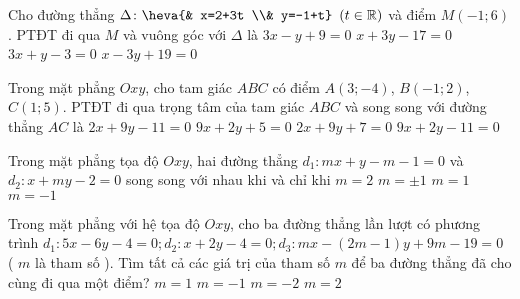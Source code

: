 	\begin{ex}%
		Cho đường thẳng $\Delta \colon \heva{& x=2+3t \\& y=-1+t}~\left(t \in \mathbb{R}\right)$ và điểm $M(-1;6)$. PTĐT đi qua $M$ và vuông góc với $\Delta$ là
		\choice
		{$3x-y+9=0$}
		{$x+3y-17=0$}
		{\True $3x+y-3=0$}
		{$x-3y+19=0$}
	\end{ex}
	\begin{ex}%
		Trong mặt phẳng $Oxy$, cho tam giác $ABC$ có điểm $A(3;-4)$, $B(-1;2)$, $C(1;5)$. PTĐT đi qua trọng tâm của tam giác $ABC$ và song song với đường thẳng $AC$ là
		\choice
		{$2x+9y-11=0$}
		{$9x+2y+5=0$}
		{$2x+9y+7=0$}
		{\True $9x+2y-11=0$}
	\end{ex}
	\begin{ex}%
		Trong mặt phẳng tọa độ $Oxy$, hai đường thẳng $d_1 \colon mx+y-m-1=0$ và $d_2 \colon x+my-2=0$ song song với nhau khi và chỉ khi
		\choice
		{$m=2$}
		{\True $m=\pm 1$}
		{$m=1$}
		{$m=-1$}
	\end{ex}
	\begin{ex}%
		Trong mặt phẳng với hệ tọa độ $Oxy$, cho ba đường thẳng lần lượt có phương trình $d_1 \colon 5x-6y-4=0;d_2 \colon x+2y-4=0;d_3 \colon mx-(2m-1)y+9m-19=0$ ( $m$ là tham số ). Tìm tất cả các giá trị của tham số $m$ để ba đường thẳng đã cho cùng đi qua một điểm?
		\choice
		{$m=1$}
		{$m=-1$}
		{$m=-2$}
		{\True $m=2$}
	\end{ex}

